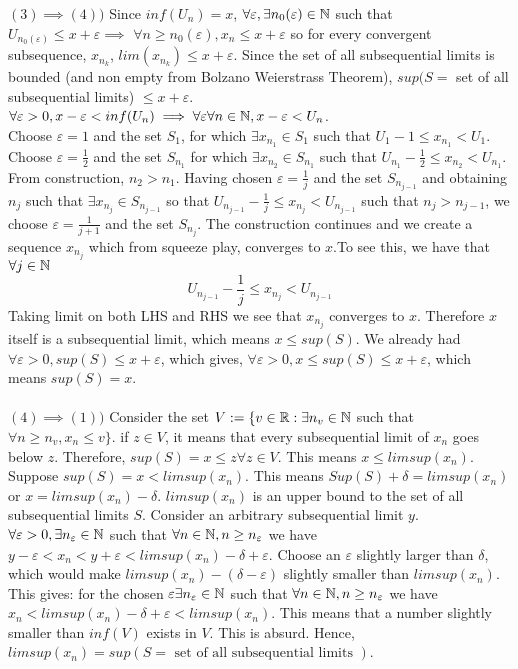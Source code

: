 \documentclass[../Main.tex]{subfiles}
\begin{document}
{$(3) \implies (4))$ Since $inf(U_n)=x$, $\forall \varepsilon, \exists n_0(\varepsilon) \in \mathbb N$ such that $U_{n_0(\varepsilon)} \leq x+\varepsilon \implies $ $\forall n \geq n_0(\varepsilon), x_n \leq x+\varepsilon$ so for every convergent subsequence, $x_{n_k}$, $lim(x_{n_k}) \leq x+ \varepsilon$. Since the set of all subsequential limits is bounded (and non empty from Bolzano Weierstrass Theorem), $sup(S=$ set of all subsequential limits) $\leq x+\varepsilon$. $\forall \varepsilon>0, x-\varepsilon<inf(U_n) \implies \forall \varepsilon \forall n \in \mathbb N, x-\varepsilon< U_n$.\\
Choose $\varepsilon=1$ and the set $S_1$, for which $\exists x_{n_1} \in S_1$ such that $U_1-1\leq x_{n_1}<U_1$. Choose $\varepsilon=\frac{1}{2}$ and the set $S_{n_1}$ for which $\exists x_{n_2} \in S_{n_1}$ such that $U_{n_1}-\frac{1}{2}\leq x_{n_2}<U_{n_1}$. From construction, $n_2>n_1$. Having chosen $\varepsilon=\frac{1}{j}$ and the set $S_{n_{j-1}}$ and obtaining $n_j$ such that $\exists x_{n_j} \in S_{n_{j-1}}$ so that $U_{n_{j-1}}-\frac{1}{j} \leq x_{n_j}<U_{n_{j-1}}$ such that $n_j>n_{j-1}$, we choose $\varepsilon=\frac{1}{j+1}$ and the set $S_{n_j}$. The construction continues and we create a sequence $x_{n_j}$ which from squeeze play, converges to $x$.To see this, we have that $\forall j \in \mathbb N$ $$U_{n_{j-1}}-\frac{1}{j} \leq x_{n_j}<U_{n_{j-1}}$$
Taking limit on both LHS and RHS we see that $x_{n_j}$ converges to $x$. Therefore $x$ itself is a subsequential limit, which means $x \leq sup(S)$. We already had $\forall \varepsilon>0, sup(S) \leq x+\varepsilon$, which gives, $\forall \varepsilon>0, x\leq sup(S) \leq x+ \varepsilon$, which means $sup(S)=x$.\\\\
$(4) \implies (1))$ Consider the set $V:=\{v \in \mathbb R: \exists n_v \in \mathbb N$ such that $ \forall n \geq n_v, x_n \leq v \}$. if $z \in V$, it means that every subsequential limit of $x_n$ goes below $z$. Therefore, $sup(S)=x \leq z \forall z\in V$. This means $x \leq limsup(x_n)$. Suppose $sup(S)=x<limsup(x_n)$. This means $Sup(S)+\delta=limsup(x_n)$ or $x=limsup(x_n)-\delta$. $limsup(x_n)$ is an upper bound to the set of all subsequential limits $S$. Consider an arbitrary subsequential limit $y$. $\forall \varepsilon>0, \exists n_{\varepsilon} \in \mathbb N$ such that $\forall n \in \mathbb N, n \geq n_{\varepsilon}$ we have $y-\varepsilon<x_n<y+\varepsilon<limsup(x_n)-\delta+\varepsilon$. Choose an $\varepsilon$ slightly larger than $\delta$, which would make $limsup(x_n)-(\delta-\varepsilon)$ slightly smaller than $limsup(x_n)$. This gives: for the chosen $\varepsilon \exists n_{\varepsilon} \in \mathbb N$ such that $\forall n \in \mathbb N, n \geq n_{\varepsilon}$ we have $x_n<limsup(x_n)-\delta+\varepsilon<limsup(x_n)$. This means that a number slightly smaller than $inf(V)$ exists in $V$. This is absurd. Hence, $limsup(x_n)=sup(S=\text{ set of all subsequential limits })$.


}
\end{document}
